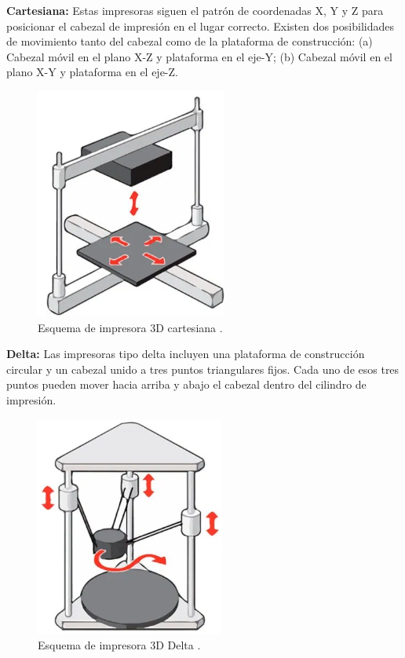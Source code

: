 \begin{description}
\item \textbf{Cartesiana:} Estas impresoras siguen el patrón de coordenadas X, Y y Z para posicionar el cabezal de impresión en el lugar correcto. Existen dos posibilidades de movimiento tanto del cabezal como de la plataforma de construcción: (a) Cabezal móvil en el plano X-Z y plataforma en el eje-Y; (b) Cabezal móvil en el plano X-Y y plataforma en el eje-Z.

\begin{figure}[H]
\centering
\includegraphics[scale=0.6]{images/cartesiana.png}
\caption{Esquema de impresora 3D cartesiana \citep{b3dsourced2020}.}
\end{figure}

\item \textbf{Delta:} Las impresoras tipo delta incluyen una plataforma de construcción circular y un cabezal unido a tres puntos triangulares fijos. Cada uno de esos tres puntos pueden mover hacia arriba y abajo el cabezal dentro del cilindro de impresión.

\begin{figure}[H]
\centering
\includegraphics[scale=0.6]{images/delta.png}
\caption{Esquema de impresora 3D Delta \citep{b3dsourced2020}.}
\end{figure}


\end{description}
